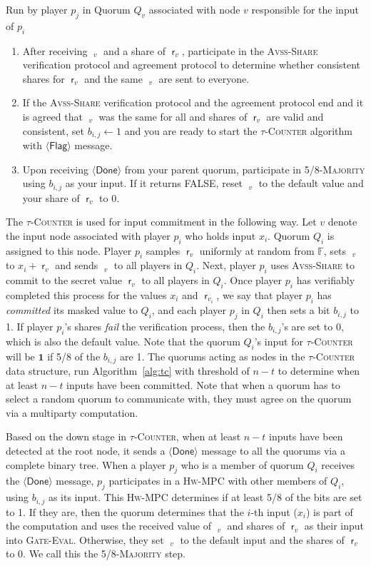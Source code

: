 \documentclass[10pt]{llncs}
\newcommand{\F}{\mathbb{F}}
\newcommand{\thresh}{5/8\xspace}
\newcommand{\flag}{$\langle\mathsf{Flag}\rangle$\xspace}
\newcommand{\done}{$\langle\mathsf{Done}\rangle$\xspace}
\newcommand{\vssSh}{\textsc{Avss-Share}\xspace}
\newcommand{\hw}{\textsc{Hw-MPC}\xspace}
\newcommand{\tc}{\textsc{$\tau$-Counter}\xspace}
\newcommand{\icInput}{\textsc{IC-Input}\xspace}
\newcommand{\gcomp}{\textsc{Gate-Eval}\xspace}
\newcommand{\maj}{\thresh-\textsc{Majority}\xspace}
\DeclareMathOperator{\mask}{\mathsf{r}}
\DeclareMathOperator{\mv}{\mathsf{\hat{y}}}
\begin{document}
\begin{algorithm}
\caption{\icInput}\label{alg:icinput}
{Run by player $p_j$ in Quorum $Q_v$ associated with node $v$ responsible for the input of $p_i$}
\begin{enumerate}
\item After receiving $\mv_{v}$  and a share of $\mask_{v}$,  
participate in the \vssSh verification protocol and agreement protocol 
to determine whether consistent shares for $\mask_{v}$ and the same $\mv_{v}$ are sent to everyone.
\item If the \vssSh verification protocol and the agreement protocol end and 
it is agreed that $\mv_{v}$ was the same for all and shares of $\mask_{v}$ are 
valid and consistent, set $b_{i,j} \leftarrow 1$ and you are ready to start the \tc algorithm with \flag message.
\item Upon receiving \done from your parent quorum,  participate 
in \maj  using $b_{i,j}$ as your input. If it returns FALSE, reset $\mv_{v}$ to the default value and your share of $\mask_v$ to 0.
\end{enumerate}
\end{algorithm}


The \tc is used for input commitment in the following way.
Let $v$ denote the input node associated with player $p_i$ who holds input 
$x_i$. Quorum $Q_i$ is assigned to this node. 
Player $p_i$  samples $\mask_{v}$  uniformly at random from $\F$,
sets $\mv_{v}$ to $x_{i} + \mask_{v}$ and sends
$\mv_{v}$ to all players in $Q_i$.  Next, player $p_i$ uses \vssSh to 
commit to the secret value $\mask_{v}$ to all
players in $Q_i$.  Once player $p_i$ has verifiably completed this
process for the values $x_{i}$ and $\mask_{v_i}$, we say that player
$p_i$ has \emph{committed} its masked value to $Q_i$, and each
player $p_j$ in $Q_i$ then sets a bit $b_{i,j}$ to 1. If player
$p_i$'s shares \emph{fail} the verification process, then the
$b_{i,j}$'s are set to 0, which is also the default value. 
Note that the quorum $Q_i$'s input for \tc will be $\mathbf{1}$ if \thresh 
of the 
$b_{i,j}$ are 1. The
quorums acting as nodes in the \tc data structure, run Algorithm~\ref{alg:tc} 
with threshold of $n-t$ to determine when at least
$n-t$ inputs have been committed. Note that when a quorum has to select a 
random quorum to communicate with, they must agree on the quorum via a 
multiparty computation.

Based on the down stage in \tc, when at least $n-t$ inputs have been
detected at the root node, it sends a \done message to all the quorums 
via a complete binary tree.
When a player $p_j$ who is a member of quorum $Q_i$ receives the \done 
message, $p_j$ participates
in a \hw with other members of $Q_i$, using $b_{i,j}$ as its
input. This \hw determines if at least \thresh of the bits are set to
1. If they are, then the quorum determines that the $i$-th input
($x_i$) is part of the computation and uses the received value of
$\mv_{v}$ and shares of $\mask_{v}$ as their input into
\gcomp. Otherwise, they set $\mv_{v}$ to the default input and the
shares of $\mask_{v}$ to 0. We call this the \maj step.
\end{document}
